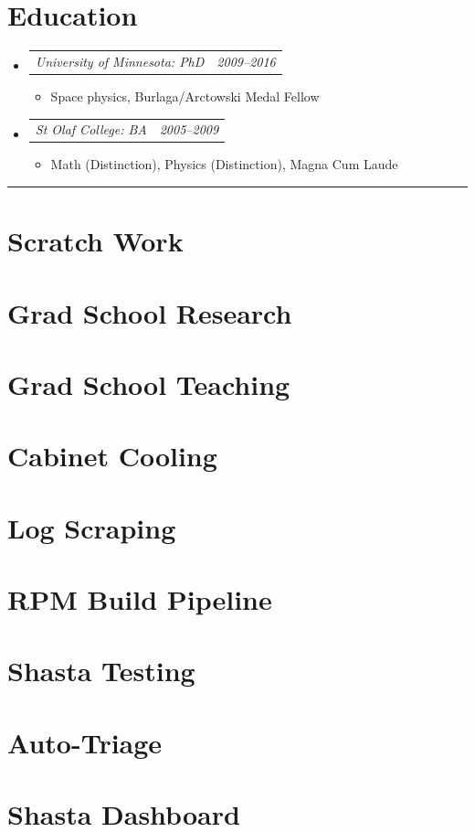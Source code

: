\documentclass[12pt,letterpaper]{article}
\makeatletter
\newcommand{\headerpair}[2]{
    \begin{tabular*}{\linewidth}{l@{ \extracolsep{\fill} }r} {\large\emph{#1}} & {\large\emph{#2}}
    \end{tabular*}
}
\newcommand{\headerrow}[3]{\headerpair{#2: #1}{#3}}
\newcommand{\ResumeSection}[1]{\section*{{\color{MidnightBlue}#1 \sout{\hfill}}}}
\makeatother
\begin{document}
\ResumeSection{Education}

\begin{itemize}[leftmargin=\parindent]
    \parskip=0.1em
    \itemsep=1.2em

    \item[]
        \headerrow
            {PhD}
            {University of Minnesota}
            {2009--2016}
        \begin{itemize}[leftmargin=\parindent]
            \item Space physics, Burlaga/Arctowski Medal Fellow
        \end{itemize}
    \item[]
        \headerrow
            {BA}
            {St Olaf College}
            {2005--2009}
        \begin{itemize}[leftmargin=\parindent]
            \item Math (Distinction), Physics (Distinction),
                 Magna Cum Laude
        \end{itemize}
\end{itemize}





\hrule

\ResumeSection{Scratch Work}


\section{Grad School Research}


\section{Grad School Teaching}



\section{Cabinet Cooling}



\section{Log Scraping}




\section{RPM Build Pipeline}



\section{Shasta Testing}



\section{Auto-Triage}


\section{Shasta Dashboard}
\end{document}
